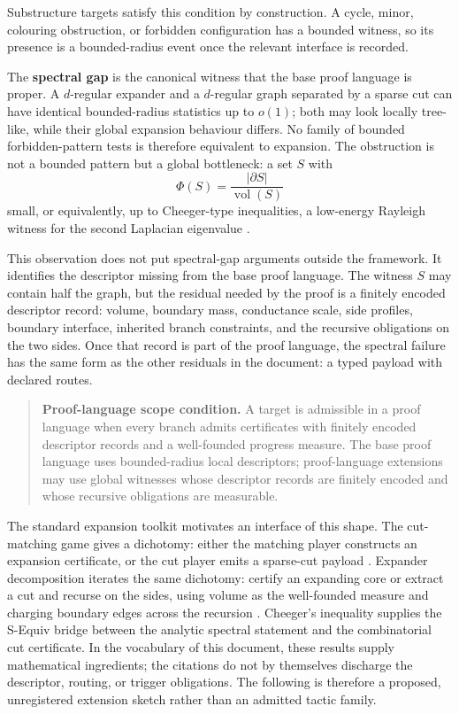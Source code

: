 \documentclass[
  11pt,
]{article}
\theoremstyle{definition}
\begin{document}
Substructure targets satisfy this condition by construction. A cycle,
minor, colouring obstruction, or forbidden configuration has a bounded
witness, so its presence is a bounded-radius event once the relevant
interface is recorded.

The \textbf{spectral gap} is the canonical witness that the base proof
language is proper. A \(d\)-regular expander and a \(d\)-regular graph separated by a
sparse cut can have identical bounded-radius statistics up to \(o(1)\);
both may look locally tree-like, while their global expansion behaviour
differs. No family of bounded forbidden-pattern tests is therefore
equivalent to expansion. The obstruction is not a bounded pattern but a
global bottleneck: a set \(S\) with
\[
\Phi(S)=\frac{|\partial S|}{\operatorname{vol}(S)}
\]
small, or equivalently, up to Cheeger-type inequalities, a low-energy
Rayleigh witness for the second Laplacian eigenvalue
\citep{chung-1997-spectral-graph-theory}.

This observation does not put spectral-gap arguments outside the
framework. It identifies the descriptor missing from the base proof language. The
witness \(S\) may contain half the graph, but the residual needed by the
proof is a finitely encoded descriptor record: volume, boundary mass,
conductance scale, side profiles, boundary interface, inherited branch
constraints, and the recursive obligations on the two sides. Once that
record is part
of the proof language, the spectral failure has the same form as the other
residuals in the document: a typed payload with declared routes.

\begin{quote}
\textbf{Proof-language scope condition.} A target is admissible in a
proof language when every branch admits certificates with finitely
encoded descriptor records and a well-founded progress measure. The base
proof language uses bounded-radius local descriptors; proof-language
extensions may use global witnesses whose descriptor records are finitely
encoded and whose recursive obligations are measurable.
\end{quote}

The standard expansion toolkit motivates an interface of this shape. The
cut-matching game gives a dichotomy: either the matching player constructs an
expansion certificate, or the cut player emits a sparse-cut payload
\citep{khandekar-rao-vazirani-2009-cut-matching}. Expander
decomposition iterates the same dichotomy: certify an expanding core or
extract a cut and recurse on the sides, using volume as the
well-founded measure and charging boundary edges across the recursion
\citep{saranurak-wang-2019-expander-decomposition}. Cheeger's
inequality supplies the S-Equiv bridge between the analytic spectral
statement and the combinatorial cut certificate. In the vocabulary of
this document, these results supply mathematical ingredients; the
citations do not by themselves discharge the descriptor, routing, or
trigger obligations. The following is therefore a proposed, unregistered
extension sketch rather than an admitted tactic family.
\end{document}
